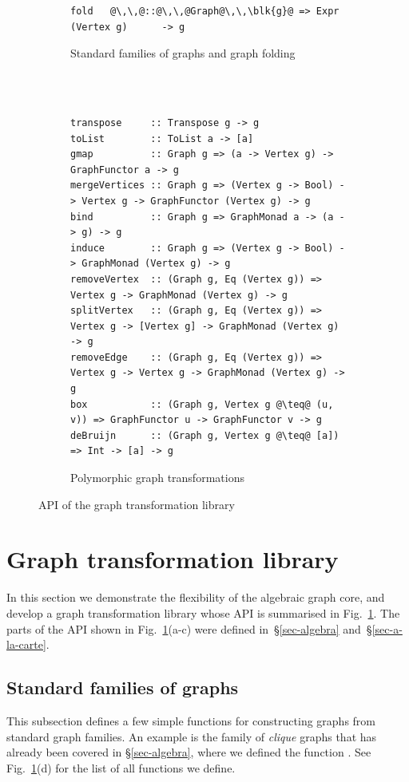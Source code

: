 \begin{figure}
\begin{subfigure}[b]{0.47\linewidth}
\begin{verbatim}
fold   @\,\,@::@\,\,@Graph@\,\,\blk{g}@ => Expr   (Vertex g)      -> g
\end{verbatim}
\caption{Standard families of graphs and graph folding}
\end{subfigure}
~\\
~\\
\begin{subfigure}[b]{\linewidth}
\begin{verbatim}
transpose     :: Transpose g -> g
toList        :: ToList a -> [a]
gmap          :: Graph g => (a -> Vertex g) -> GraphFunctor a -> g
mergeVertices :: Graph g => (Vertex g -> Bool) -> Vertex g -> GraphFunctor (Vertex g) -> g
bind          :: Graph g => GraphMonad a -> (a -> g) -> g
induce        :: Graph g => (Vertex g -> Bool) -> GraphMonad (Vertex g) -> g
removeVertex  :: (Graph g, Eq (Vertex g)) => Vertex g -> GraphMonad (Vertex g) -> g
splitVertex   :: (Graph g, Eq (Vertex g)) => Vertex g -> [Vertex g] -> GraphMonad (Vertex g) -> g
removeEdge    :: (Graph g, Eq (Vertex g)) => Vertex g -> Vertex g -> GraphMonad (Vertex g) -> g
box           :: (Graph g, Vertex g @\teq@ (u, v)) => GraphFunctor u -> GraphFunctor v -> g
deBruijn      :: (Graph g, Vertex g @\teq@ [a]) => Int -> [a] -> g
\end{verbatim}
\caption{Polymorphic graph transformations}
\end{subfigure}
\vspace{-3mm}
\caption{API of the graph transformation library\label{fig-api}}
\end{figure}

\newpage
\section{Graph transformation library}\label{sec-transformations}

In this section we demonstrate the flexibility of the algebraic graph core,
and develop a graph transformation library whose API is summarised in
Fig.~\ref{fig-api}. The parts of the API shown in Fig.~\ref{fig-api}(a-c)
were defined in~\S\ref{sec-algebra} and~\S\ref{sec-a-la-carte}.

\subsection{Standard families of graphs}\label{sub-families}

This subsection defines a few simple functions for constructing graphs from
standard graph families. An example is the family of \emph{clique} graphs that has
already been covered in \S\ref{sec-algebra}, where we defined the function
. See Fig.~\ref{fig-api}(d) for the list of all functions we define.

